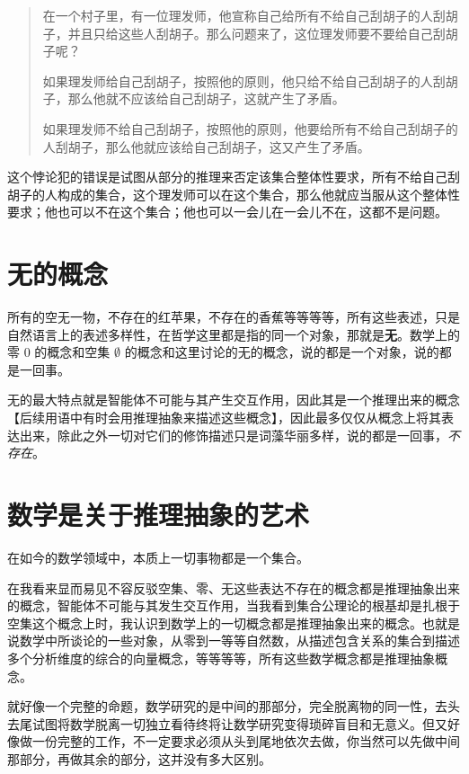 \documentclass[12pt,oneside]{book}
\begin{document}
\begin{quote}
在一个村子里，有一位理发师，他宣称自己给所有不给自己刮胡子的人刮胡子，并且只给这些人刮胡子。那么问题来了，这位理发师要不要给自己刮胡子呢？

如果理发师给自己刮胡子，按照他的原则，他只给不给自己刮胡子的人刮胡子，那么他就不应该给自己刮胡子，这就产生了矛盾。

如果理发师不给自己刮胡子，按照他的原则，他要给所有不给自己刮胡子的人刮胡子，那么他就应该给自己刮胡子，这又产生了矛盾。
\end{quote}

这个悖论犯的错误是试图从部分的推理来否定该集合整体性要求，所有不给自己刮胡子的人构成的集合，这个理发师可以在这个集合，那么他就应当服从这个整体性要求；他也可以不在这个集合；他也可以一会儿在一会儿不在，这都不是问题。

\section{无的概念}
所有的空无一物，不存在的红苹果，不存在的香蕉等等等等，所有这些表述，只是自然语言上的表述多样性，在哲学这里都是指的同一个对象，那就是\textbf{无}。数学上的零 $0$ 的概念和空集 $\emptyset$ 的概念和这里讨论的无的概念，说的都是一个对象，说的都是一回事。

无的最大特点就是智能体不可能与其产生交互作用，因此其是一个推理出来的概念【后续用语中有时会用推理抽象来描述这些概念】，因此最多仅仅从概念上将其表达出来，除此之外一切对它们的修饰描述只是词藻华丽多样，说的都是一回事，\textit{不存在}。

\section{数学是关于推理抽象的艺术}
\begin{bookref}[frametitle={\cite{Elements of Set Theory}}]
在如今的数学领域中，本质上一切事物都是一个集合。
\end{bookref}

在我看来显而易见不容反驳空集、零、无这些表达不存在的概念都是推理抽象出来的概念，智能体不可能与其发生交互作用，当我看到集合公理论的根基却是扎根于空集这个概念上时，我认识到数学上的一切概念都是推理抽象出来的概念。也就是说数学中所谈论的一些对象，从零到一等等自然数，从描述包含关系的集合到描述多个分析维度的综合的向量概念，等等等等，所有这些数学概念都是推理抽象概念。

就好像一个完整的命题，数学研究的是中间的那部分，完全脱离物的同一性，去头去尾试图将数学脱离一切独立看待终将让数学研究变得琐碎盲目和无意义。但又好像做一份完整的工作，不一定要求必须从头到尾地依次去做，你当然可以先做中间那部分，再做其余的部分，这并没有多大区别。
\end{document}
